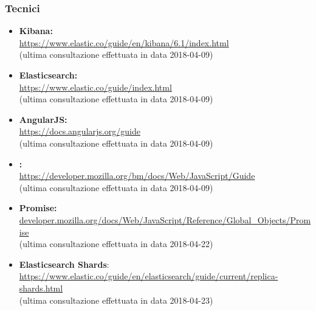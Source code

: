 \subsubsection{Tecnici}
\begin{itemize}
	\item \textbf{Kibana:}\\ \href{https://www.elastic.co/guide/en/kibana/6.1/index.html}{https://www.elastic.co/guide/en/kibana/6.1/index.html}\\(ultima consultazione effettuata in data 2018-04-09)
	\item \textbf{Elasticsearch:}\\ \href{https://www.elastic.co/guide/index.html}{https://www.elastic.co/guide/index.html}\\(ultima consultazione effettuata in data 2018-04-09)
	\item \textbf{AngularJS:}\\ \href{https://docs.angularjs.org/guide}{https://docs.angularjs.org/guide}\\(ultima consultazione effettuata in data 2018-04-09)
	\item \textbf{:}\\ \href{https://developer.mozilla.org/bm/docs/Web/JavaScript/Guide}{https://developer.mozilla.org/bm/docs/Web/JavaScript/Guide}\\(ultima consultazione effettuata in data 2018-04-09) 
	\item \textbf{Promise:}\\ \href{https://developer.mozilla.org/docs/Web/JavaScript/Reference/Global\_Objects/Promise}{developer.mozilla.org/docs/Web/JavaScript/Reference/Global\_Objects/Promise}\\(ultima consultazione effettuata in data 2018-04-22) 
	\item \textbf{Elasticsearch Shards}:\\ \href{https://www.elastic.co/guide/en/elasticsearch/guide/current/replica-shards.html}{https://www.elastic.co/guide/en/elasticsearch/guide/current/replica-shards.html}\\(ultima consultazione effettuata in data 2018-04-23) 
\end{itemize}

